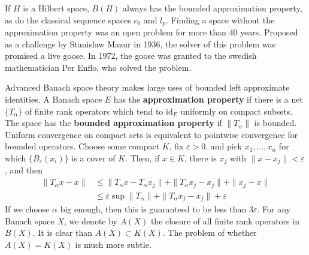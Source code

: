 \begin{example}
    If $H$ is a Hilbert space, $B(H)$ always has the bounded approximation property, as do the classical sequence spaces $c_0$ and $l_p$. Finding a space without the approximation property was an open problem for more than 40 years. Proposed as a challenge by Stanislaw Mazur in 1936, the solver of this problem was promised a live goose. In 1972, the goose was granted to the swedish mathematician Per Enflo, who solved the problem.
\end{example}

Advanced Banach space theory makes large uses of bounded left approximate identities. A Banach space $E$ has the {\bf approximation property} if there is a net $\{ T_\alpha \}$ of finite rank operators which tend to $\text{id}_E$ uniformly on compact subsets. The space has the {\bf bounded approximation property} if $\| T_\alpha \|$ is bounded. Uniform convergence on compact sets is equivalent to pointwise convergence for bounded operators. Choose some compact $K$, fix $\varepsilon > 0$, and pick $x_1, \dots, x_n$ for which $\{ B_\varepsilon(x_i) \}$ is a cover of $K$. Then, if $x \in K$, there is $x_j$ with $\| x - x_j \| < \varepsilon$, and then
%
\begin{align*}
    \| T_\alpha x - x \| &\leq \| T_\alpha x - T_\alpha x_j \| + \| T_\alpha x_j - x_j \| + \| x_j - x \|\\
    &\leq \varepsilon \sup \|T_\alpha\| + \| T_\alpha x_j - x_j \| + \varepsilon
\end{align*}
%
If we choose $\alpha$ big enough, then this is guaranteed to be less than $3 \varepsilon$. For any Banach space $X$, we denote by $A(X)$ the closure of all finite rank operators in $B(X)$. It is clear than $A(X) \subset K(X)$. The problem of whether $A(X) = K(X)$ is much more subtle.

